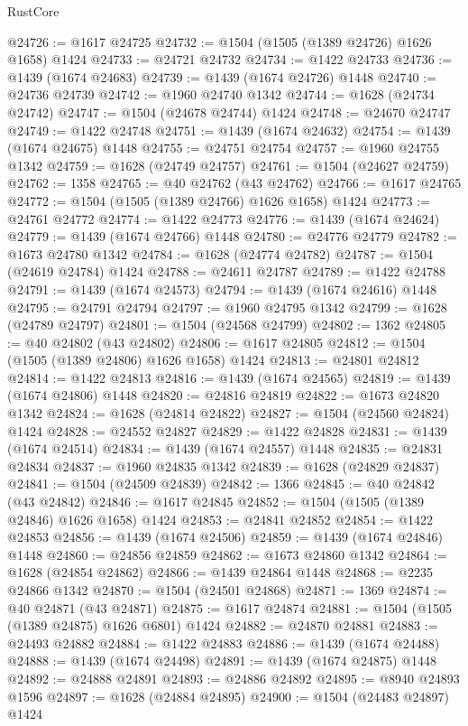 \begin{lexlean}{RustCore}
\begin{coremodule}
@24726 := @1617 @24725
@24732 := @1504 (@1505 (@1389 @24726) @1626 @1658) @1424
@24733 := @24721 @24732
@24734 := @1422 @24733
@24736 := @1439 (@1674 @24683)
@24739 := @1439 (@1674 @24726) @1448
@24740 := @24736 @24739
@24742 := @1960 @24740 @1342
@24744 := @1628 (@24734 @24742)
@24747 := @1504 (@24678 @24744) @1424
@24748 := @24670 @24747
@24749 := @1422 @24748
@24751 := @1439 (@1674 @24632)
@24754 := @1439 (@1674 @24675) @1448
@24755 := @24751 @24754
@24757 := @1960 @24755 @1342
@24759 := @1628 (@24749 @24757)
@24761 := @1504 (@24627 @24759)
@24762 := 1358
@24765 := @40 @24762 (@43 @24762)
@24766 := @1617 @24765
@24772 := @1504 (@1505 (@1389 @24766) @1626 @1658) @1424
@24773 := @24761 @24772
@24774 := @1422 @24773
@24776 := @1439 (@1674 @24624)
@24779 := @1439 (@1674 @24766) @1448
@24780 := @24776 @24779
@24782 := @1673 @24780 @1342
@24784 := @1628 (@24774 @24782)
@24787 := @1504 (@24619 @24784) @1424
@24788 := @24611 @24787
@24789 := @1422 @24788
@24791 := @1439 (@1674 @24573)
@24794 := @1439 (@1674 @24616) @1448
@24795 := @24791 @24794
@24797 := @1960 @24795 @1342
@24799 := @1628 (@24789 @24797)
@24801 := @1504 (@24568 @24799)
@24802 := 1362
@24805 := @40 @24802 (@43 @24802)
@24806 := @1617 @24805
@24812 := @1504 (@1505 (@1389 @24806) @1626 @1658) @1424
@24813 := @24801 @24812
@24814 := @1422 @24813
@24816 := @1439 (@1674 @24565)
@24819 := @1439 (@1674 @24806) @1448
@24820 := @24816 @24819
@24822 := @1673 @24820 @1342
@24824 := @1628 (@24814 @24822)
@24827 := @1504 (@24560 @24824) @1424
@24828 := @24552 @24827
@24829 := @1422 @24828
@24831 := @1439 (@1674 @24514)
@24834 := @1439 (@1674 @24557) @1448
@24835 := @24831 @24834
@24837 := @1960 @24835 @1342
@24839 := @1628 (@24829 @24837)
@24841 := @1504 (@24509 @24839)
@24842 := 1366
@24845 := @40 @24842 (@43 @24842)
@24846 := @1617 @24845
@24852 := @1504 (@1505 (@1389 @24846) @1626 @1658) @1424
@24853 := @24841 @24852
@24854 := @1422 @24853
@24856 := @1439 (@1674 @24506)
@24859 := @1439 (@1674 @24846) @1448
@24860 := @24856 @24859
@24862 := @1673 @24860 @1342
@24864 := @1628 (@24854 @24862)
@24866 := @1439 @24864 @1448
@24868 := @2235 @24866 @1342
@24870 := @1504 (@24501 @24868)
@24871 := 1369
@24874 := @40 @24871 (@43 @24871)
@24875 := @1617 @24874
@24881 := @1504 (@1505 (@1389 @24875) @1626 @6801) @1424
@24882 := @24870 @24881
@24883 := @24493 @24882
@24884 := @1422 @24883
@24886 := @1439 (@1674 @24488)
@24888 := @1439 (@1674 @24498)
@24891 := @1439 (@1674 @24875) @1448
@24892 := @24888 @24891
@24893 := @24886 @24892
@24895 := @8940 @24893 @1596
@24897 := @1628 (@24884 @24895)
@24900 := @1504 (@24483 @24897) @1424

\end{coremodule}
\end{lexlean}
